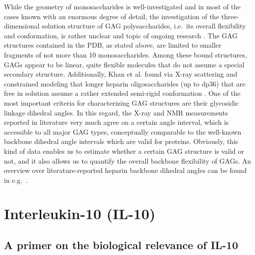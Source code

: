 While the geometry of monosaccharides is well-investigated and in most of the
cases known with an enormous degree of detail, the investigation of the
three-dimensional solution structure of GAG polysaccharides, i.e.\ its overall
flexibility and conformation, is rather unclear and topic of ongoing research
\cite{structure_gags_progess_perspectives_2010}. The GAG structures contained in
the PDB, as stated above, are limited to smaller fragments of not more than 10
monosaccharides. Among these bound structures, GAGs appear to be linear, quite
flexible molecules that do not assume a special secondary structure.
Additionally, Khan et al. found via X-ray scattering and constrained modeling
that longer heparin oligosaccharides (up to dp36) that are free in solution
assume a rather extended semi-rigid conformation
\cite{semi_rigid_heparin_structures_2010}. One of the most important criteria
for characterizing GAG structures are their glycosidic linkage dihedral angles.
In this regard, the X-ray and NMR measurements reported in literature very much
agree on a certain angle interval, which is accessible to all major GAG types,
conceptually comparable to the well-known backbone dihedral angle intervals
which are valid for proteins. Obviously, this kind of data enables us to
estimate whether a certain GAG structure is valid or not, and it also allows us
to quantify the overall backbone flexibility of GAGs. An overview over
literature-reported heparin backbone dihedral angles can be found in e.g.\
\cite{semi_rigid_heparin_structures_2010}.



\section{Interleukin-10 (IL-10)}

\subsection{A primer on the biological relevance of IL-10}

